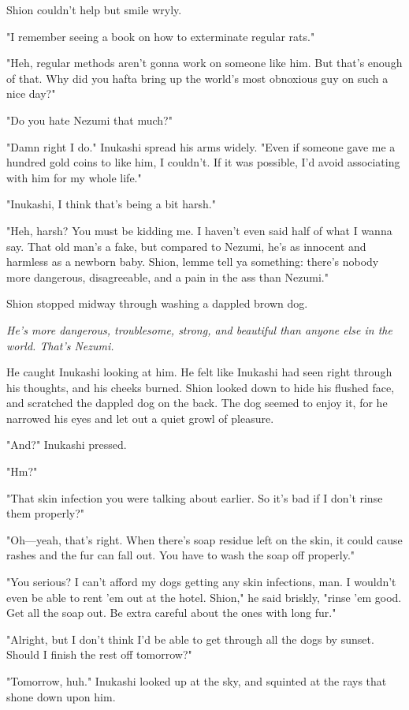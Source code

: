 Shion couldn't help but smile wryly.

"I remember seeing a book on how to exterminate regular rats."

"Heh, regular methods aren't gonna work on someone like him. But that's
enough of that. Why did you hafta bring up the world's most obnoxious
guy on such a nice day?"

"Do you hate Nezumi that much?"

"Damn right I do." Inukashi spread his arms widely. "Even if someone
gave me a hundred gold coins to like him, I couldn't. If it was
possible, I'd avoid associating with him for my whole life."

"Inukashi, I think that's being a bit harsh."

"Heh, harsh? You must be kidding me. I haven't even said half of what I
wanna say. That old man's a fake, but compared to Nezumi, he's as
innocent and harmless as a newborn baby. Shion, lemme tell ya something:
there's nobody more dangerous, disagreeable, and a pain in the ass than
Nezumi."

Shion stopped midway through washing a dappled brown dog.

\emph{He's more dangerous, troublesome, strong, and beautiful than anyone else
in the world. That's Nezumi.}

He caught Inukashi looking at him. He felt like Inukashi had seen right
through his thoughts, and his cheeks burned. Shion looked down to hide
his flushed face, and scratched the dappled dog on the back. The dog
seemed to enjoy it, for he narrowed his eyes and let out a quiet growl
of pleasure.

"And?" Inukashi pressed.

"Hm?"

"That skin infection you were talking about earlier. So it's bad if I
don't rinse them properly?"

"Oh---yeah, that's right. When there's soap residue left on the skin, it
could cause rashes and the fur can fall out. You have to wash the soap
off properly."

"You serious? I can't afford my dogs getting any skin infections, man. I
wouldn't even be able to rent 'em out at the hotel. Shion," he said
briskly, "rinse 'em good. Get all the soap out. Be extra careful about
the ones with long fur."

"Alright, but I don't think I'd be able to get through all the dogs by
sunset. Should I finish the rest off tomorrow?"

"Tomorrow, huh." Inukashi looked up at the sky, and squinted at the rays
that shone down upon him.

